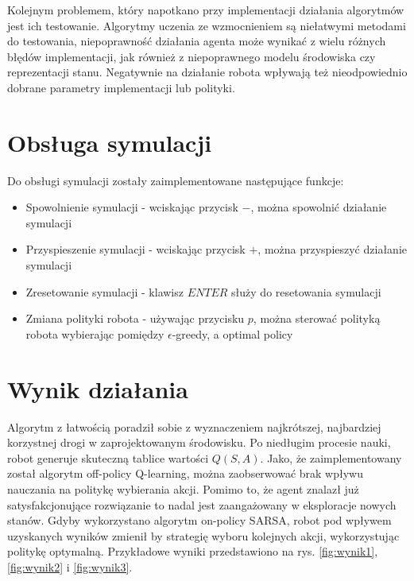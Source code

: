 Kolejnym problemem, który napotkano przy implementacji działania algorytmów jest ich testowanie. Algorytmy uczenia ze 
wzmocnieniem są niełatwymi metodami do testowania, niepoprawność działania agenta może wynikać z wielu różnych błędów 
implementacji, jak również z niepoprawnego modelu środowiska czy reprezentacji stanu. Negatywnie na 
działanie robota wpływają też nieodpowiednio dobrane parametry implementacji lub polityki.

\section{Obsługa symulacji}

Do obsługi symulacji zostały zaimplementowane następujące funkcje:
\begin{itemize}
 \item Spowolnienie symulacji - wciskając przycisk $-$, można spowolnić działanie symulacji
 \item Przyspieszenie symulacji - wciskając przycisk $+$, można przyspieszyć działanie symulacji
 \item Zresetowanie symulacji - klawisz $ENTER$ służy do resetowania symulacji
 \item Zmiana polityki robota - używając przycisku $p$, można sterować polityką robota wybierając pomiędzy 
$\epsilon$-greedy, a optimal policy
\end{itemize}


\section{Wynik działania}
\label{sec:wynikdzialania}

Algorytm z łatwością poradził sobie z wyznaczeniem najkrótszej, najbardziej korzystnej drogi w 
zaprojektowanym środowisku. Po niedługim procesie nauki, robot generuje skuteczną tablice wartości $Q(S, A)$.
Jako, że zaimplementowany został algorytm off-policy Q-learning, można zaobserwować brak wpływu nauczania na politykę 
wybierania akcji. Pomimo to, że agent znalazł już satysfakcjonujące rozwiązanie to nadal jest zaangażowany w eksploracje 
nowych stanów. Gdyby wykorzystano algorytm on-policy SARSA, robot pod wpływem uzyskanych wyników zmienił by strategię 
wyboru kolejnych akcji, wykorzystując politykę optymalną. Przykładowe wyniki przedstawiono na rys. \ref{fig:wynik1}, 
\ref{fig:wynik2} i \ref{fig:wynik3}.

